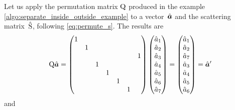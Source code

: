 Let us apply the permutation matrix $\mathrm{Q}$ produced in the example \cref{algo:separate_inside_outside_example} to a vector~$\hat{\bm{a}}$ and the scattering matrix~$\hat{\mathrm{S}}$, following \cref{eq:permute_s}.
The results are
\begin{equation}
    \mathrm{Q} \hat{\bm{a}}
    =
    \begin{pmatrix}
        1  &     &     &     &     &     &     \\
           &  1  &     &     &     &     &     \\
           &     &     &     &     &     &  1  \\
           &     &  1  &     &     &     &     \\
           &     &     &  1  &     &     &     \\
           &     &     &     &  1  &     &     \\
           &     &     &     &     &  1  &     \\
    \end{pmatrix}
    \begin{pmatrix}
        \hat{a}_1 \\ \hat{a}_2 \\ \hat{a}_3 \\ \hat{a}_4 \\ \hat{a}_5 \\ \hat{a}_6 \\ \hat{a}_7
    \end{pmatrix}
    =
    \begin{pmatrix}
        \hat{a}_1 \\ \hat{a}_2 \\ \hat{a}_7 \\ \hat{a}_3 \\ \hat{a}_4 \\ \hat{a}_5 \\ \hat{a}_6
    \end{pmatrix}
    =
    \hat{\bm{a}}'
    \label{eq:q_a_aprime}
\end{equation}
and

